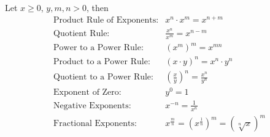 \documentclass{ximera}
\begin{document}
 \begin{summary}

  Let $x\geq 0$, $y,m,n >0$, then \\

\[
\begin{array}{ll}
\text{Product Rule of Exponents:}&x^{n} \cdot x^{m} = x^{n+m}\\[4ex]
\text{Quotient Rule:}&\frac{x^n}{x^m}=x^{n-m}\\[4ex]
\text{Power to a Power Rule:}&\left(x^{m}\right)^m = x^{mn}\\[4ex]
\text{Product to a Power Rule:}&\left(x \cdot y \right)^{n} = x^{n} \cdot y^{n}\\[4ex]
\text{Quotient to a Power Rule:}&\left(\frac{x}{y}\right)^n=\frac{x^n}{y^n}\\[4ex]
\text{Exponent of Zero:}&y^0=1\\[4ex]
\text{Negative Exponents:}&x^{-n} = \frac{1}{x^{n}}\\[4ex]
\text{Fractional Exponents:}&x^{\frac{m}{n}}=\left(x^{\frac{1}{n}}\right)^m=\left(\sqrt[n]{x}\right)^m
\end{array}
\]

\end{summary}
\end{document}
